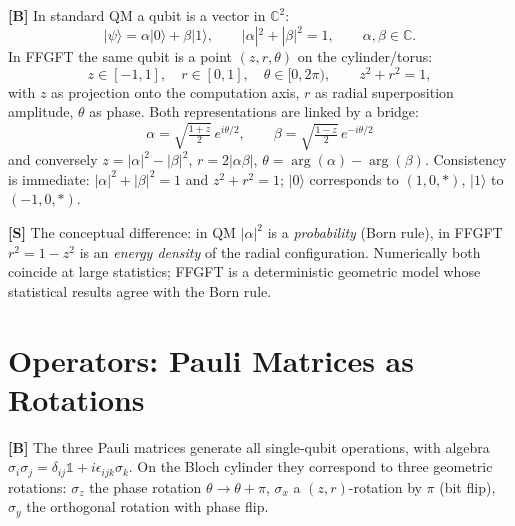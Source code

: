 \textbf{[B]} In standard QM a qubit is a vector in $\mathbb{C}^2$:
\[
  |\psi\rangle = \alpha|0\rangle + \beta|1\rangle,
  \qquad |\alpha|^2 + |\beta|^2 = 1,\qquad \alpha,\beta\in\mathbb{C}.
\]
In FFGFT the same qubit is a point $(z,r,\theta)$ on the cylinder/torus:
\[
  z\in[-1,1],\quad r\in[0,1],\quad \theta\in[0,2\pi),\qquad z^2+r^2=1,
\]
with $z$ as projection onto the computation axis, $r$ as radial superposition
amplitude, $\theta$ as phase. Both representations are linked by a bridge:
\[
  \boxed{\;
  \alpha = \sqrt{\tfrac{1+z}{2}}\,e^{i\theta/2},
  \qquad
  \beta = \sqrt{\tfrac{1-z}{2}}\,e^{-i\theta/2}\;}
\]
and conversely $z = |\alpha|^2-|\beta|^2$, $r = 2|\alpha\beta|$,
$\theta = \arg(\alpha)-\arg(\beta)$. Consistency is immediate:
$|\alpha|^2+|\beta|^2 = 1$ and $z^2+r^2 = 1$; $|0\rangle$ corresponds to
$(1,0,*)$, $|1\rangle$ to $(-1,0,*)$.

\textbf{[S]} The conceptual difference: in QM $|\alpha|^2$ is a
\emph{probability} (Born rule), in FFGFT $r^2 = 1-z^2$ is an \emph{energy
density} of the radial configuration. Numerically both coincide at large
statistics; FFGFT is a deterministic geometric model whose statistical results
agree with the Born rule.

\section{Operators: Pauli Matrices as Rotations}

\textbf{[B]} The three Pauli matrices generate all single-qubit operations, with
algebra $\sigma_i\sigma_j = \delta_{ij}\mathbb{1} + i\epsilon_{ijk}\sigma_k$.
On the Bloch cylinder they correspond to three geometric rotations: $\sigma_z$
the phase rotation $\theta\to\theta+\pi$, $\sigma_x$ a $(z,r)$-rotation by $\pi$
(bit flip), $\sigma_y$ the orthogonal rotation with phase flip.


